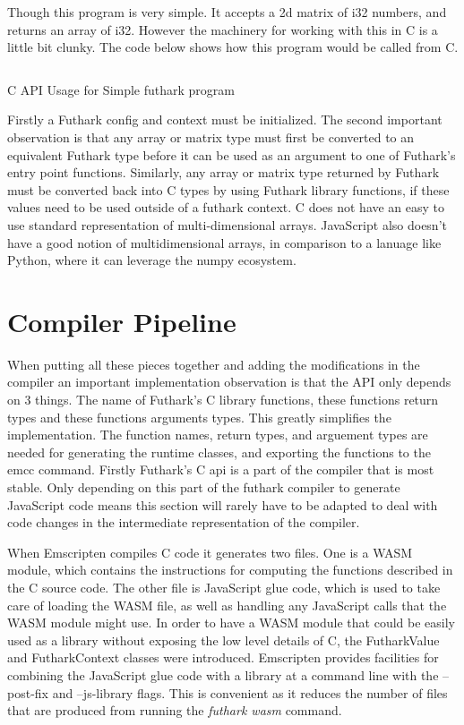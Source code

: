 \documentclass[11pt]{book}
\begin{document}
Though this program is very simple. It accepts a 2d matrix of i32 numbers, and returns an array of i32. However the machinery for working with this in C is a little bit clunky. The code below shows how this program would be called from C.

\begin{listing}[H] 
        \inputminted[fontsize=\small,baselinestretch=0.5,linenos]{C}{code/compiler/c-backend/example.c}
        \caption{C API Usage for Simple futhark program}

        \label{lst:capi}    
\end{listing} 

Firstly a Futhark config and context must be initialized. The second important observation is that any array or matrix type must first be converted to an equivalent Futhark type before it can be used as an argument to one of Futhark's entry point functions. Similarly, any array or matrix type returned by Futhark must be converted back into C types by using Futhark library functions, if these values need to be used outside of a futhark context. C does not have an easy to use standard representation of multi-dimensional arrays. JavaScript also doesn't have a good notion of multidimensional arrays, in comparison to a lanuage like Python, where it can leverage the numpy ecosystem. 



\section{Compiler Pipeline}

When putting all these pieces together and adding the modifications in the compiler an important implementation observation is that the API only depends on 3 things. The name of Futhark's C library functions, these functions return types and these functions arguments types. This greatly simplifies the implementation. The function names, return types, and arguement types are needed for generating the runtime classes, and exporting the functions to the emcc command. Firstly Futhark's C api is a part of the compiler that is most stable. Only depending on this part of the futhark compiler to generate JavaScript code means this section will rarely have to be adapted to deal with code changes in the intermediate representation of the compiler.

When Emscripten compiles C code it generates two files. One is a WASM module, which contains the instructions for computing the functions described in the C source code. The other file is JavaScript glue code, which is used to take care of loading the WASM file, as well as handling any JavaScript calls that the WASM module might use. In order to have a WASM module that could be easily used as a library without exposing the low level details of C, the FutharkValue and FutharkContext classes were introduced. Emscripten provides facilities for combining the JavaScript glue code with a library at a command line with the --post-fix and --js-library flags. This is convenient as it reduces the number of files that are produced from running the \textit{futhark wasm} command.
\end{document}
